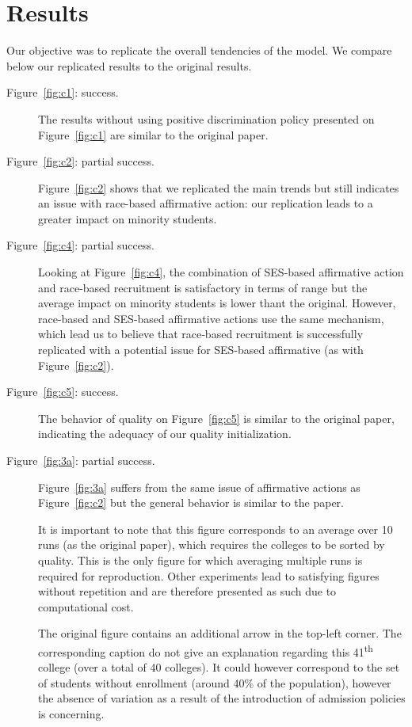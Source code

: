 \section{Results}\label{sec:results}

Our objective was to replicate the overall tendencies of the model.
We compare below our replicated results to the original results.

\begin{description}

\item[Figure~\ref{fig:c1}: success.] The results without using positive discrimination policy presented on Figure~\ref{fig:c1} are similar to the original paper.

\item[Figure~\ref{fig:c2}: partial success.] Figure~\ref{fig:c2} shows that we replicated the main trends but still indicates an issue with race-based affirmative action: our replication leads to a greater impact on minority students.

\item [Figure~\ref{fig:c4}: partial success.] Looking at Figure~\ref{fig:c4}, the combination of SES-based affirmative action and race-based recruitment is satisfactory in terms of range but the average impact on minority students is lower thant the original.
However, race-based and SES-based affirmative actions use the same mechanism, which lead us to believe that race‐based recruitment is successfully replicated with a potential issue for SES-based affirmative (as with Figure~\ref{fig:c2}).

\item [Figure~\ref{fig:c5}: success.]  The behavior of quality on Figure~\ref{fig:c5} is similar to the original paper, indicating the adequacy of our quality initialization.

\item[Figure~\ref{fig:3a}: partial success.]  Figure~\ref{fig:3a} suffers from the same issue of affirmative actions as Figure~\ref{fig:c2} but the general behavior is similar to the paper.

It is important to note that this figure corresponds to an average over 10 runs (as the original paper), which requires the colleges to be sorted by quality. This is the only figure for which averaging multiple runs is required for reproduction. Other experiments lead to satisfying figures without repetition and are therefore presented as such due to computational cost.

The original figure contains an additional arrow in the top-left corner. The corresponding caption do not give an explanation regarding this 41\textsuperscript{th} college (over a total of 40 colleges). It could however correspond to the set of students without enrollment (around 40\% of the population), however the absence of variation as a result of the introduction of admission policies is concerning.


\end{description}

